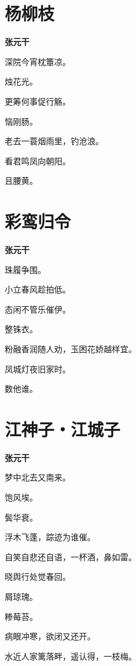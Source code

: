 \documentclass[12pt,a4paper]{ctexbook}
\begin{document}
\section{杨柳枝}
\textbf{张元干}\par\vspace{0.5em}
深院今宵枕簟凉。\par
烛花光。\par
更筹何事促行觞。\par
恼刚肠。\par
老去一蓑烟雨里，钓沧浪。\par
看君鸣凤向朝阳。\par
且腰黄。\par

\section{彩鸾归令}
\textbf{张元干}\par\vspace{0.5em}
珠履争围。\par
小立春风趁拍低。\par
态闲不管乐催伊。\par
整铢衣。\par
粉融香润随人劝，玉困花娇越样宜。\par
凤城灯夜旧家时。\par
数他谁。\par

\section{江神子・江城子}
\textbf{张元干}\par\vspace{0.5em}
梦中北去又南来。\par
饱风埃。\par
鬓华衰。\par
浮木飞蓬，踪迹为谁催。\par
自笑自悲还自语，一杯酒，鼻如雷。\par
晓舆行处觉春回。\par
屑琼瑰。\par
糁莓苔。\par
病眼冲寒，欲闭又还开。\par
水近人家篱落畔，遥认得，一枝梅。\par
\end{document}
